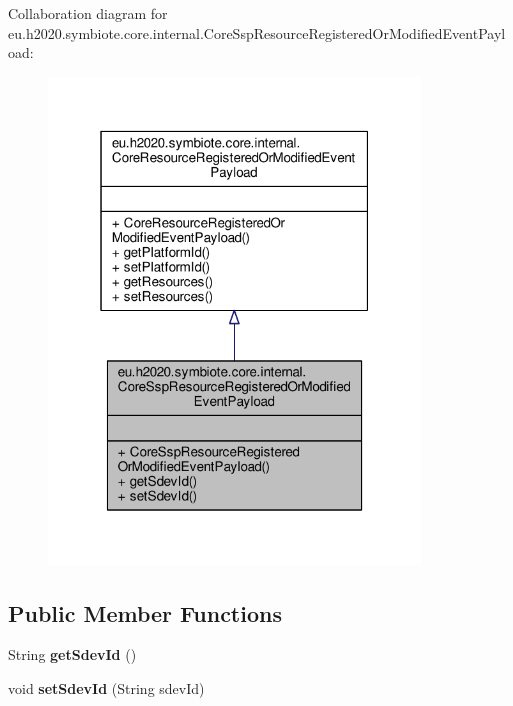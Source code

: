Collaboration diagram for eu.\+h2020.\+symbiote.\+core.\+internal.\+Core\+Ssp\+Resource\+Registered\+Or\+Modified\+Event\+Payload\+:
\nopagebreak
\begin{figure}[H]
\begin{center}
\leavevmode
\includegraphics[width=280pt]{classeu_1_1h2020_1_1symbiote_1_1core_1_1internal_1_1CoreSspResourceRegisteredOrModifiedEventPayload__coll__graph}
\end{center}
\end{figure}
\subsection*{Public Member Functions}
\begin{DoxyCompactItemize}
\item 
\mbox{\label{classeu_1_1h2020_1_1symbiote_1_1core_1_1internal_1_1CoreSspResourceRegisteredOrModifiedEventPayload_a07d4e228ab28a33baeac0cd527191b1f}} 
String {\bfseries get\+Sdev\+Id} ()
\item 
\mbox{\label{classeu_1_1h2020_1_1symbiote_1_1core_1_1internal_1_1CoreSspResourceRegisteredOrModifiedEventPayload_a7a50f739df0bf5cce881ca0873ee239d}} 
void {\bfseries set\+Sdev\+Id} (String sdev\+Id)
\end{DoxyCompactItemize}


